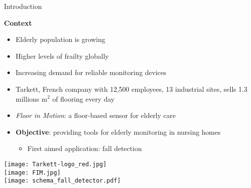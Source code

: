 \begin{frame}{Introduction}
\begin{minipage}[t]{\linewidth}
    \begin{minipage}[t]{0.5\linewidth}
        \textbf{Context}
        \begin{itemize}
            \item Elderly population is growing
            \item Higher levels of frailty globally
            \item Increasing demand for reliable monitoring devices
            \item Tarkett, French company with 12,500 employees, 13 industrial sites, sells 1.3 millions m$^2$ of flooring every day
            \item \emph{Floor in Motion}: a floor-based sensor for elderly care
            \item \textbf{Objective}: providing tools for elderly monitoring in nursing homes
            \begin{itemize}
                \item First aimed application: fall detection
            \end{itemize}
        \end{itemize}
    \end{minipage}
    \begin{minipage}[t]{0.5\linewidth}
                \centering
                \vspace{1cm}
                \texttt{[image: Tarkett-logo\_red.jpg]}\\[5pt]
                \texttt{[image: FIM.jpg]}\\[15pt]
                \texttt{[image: schema\_fall\_detector.pdf]}\\
    \end{minipage}
\end{minipage}
\end{frame}

